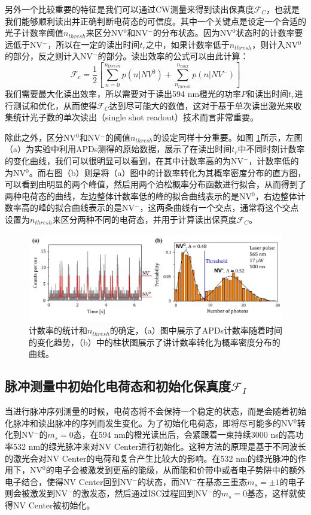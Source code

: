 \documentclass[type = bachelor]{whu-thesis}
\begin{document}
另外一个比较重要的特征是我们可以通过CW测量来得到读出保真度$\mathcal{F}_C$，也就是我们能够顺利读出并正确判断电荷态的可信度。其中一个关键点是设定一个合适的光子计数率阈值$n_{thresh}$来区分NV$^0$和NV$^-$的分布状态。因为NV$^0$状态时的计数率要远低于NV$^-$，所以在一定的读出时间$t_r$之中，如果计数率低于$n_{thresh}$，则计入NV$^0$的部分，反之则计入NV$^-$的部分。读出效率的公式可以由此计算：
\begin{equation}
  \mathcal{F}_c = \frac{1}{2}[\sum_{n=0}^{n_{thresh}}p(n|NV^0)+\sum_{n_{thresh}}^{n_{max}}p(n|NV^-)]
\end{equation}
我们需要最大化读出效率，所以需要对于读出594 nm橙光的功率$P$和读出时间$t_r$进行测试和优化，从而使得$\mathcal{F}_C$达到尽可能大的数值，这对于基于单次读出激光来收集统计光子数的单次读出（single shot readout）技术而言非常重要。

除此之外，区分NV$^0$和NV$^-$的阈值$n_{thresh}$的设定同样十分重要。如图 \ref{fig: n_thresh}所示，左图（a）为实验中利用APDs测得的原始数据，展示了在读出时间$t_r$中不同时刻计数率的变化曲线，我们可以很明显可以看到，在其中计数率高的为NV$^-$，计数率低的为NV$^0$。而右图（b）则是将（a）图中的计数率转化为其概率密度分布的直方图，可以看到由明显的两个峰值，然后用两个泊松概率分布函数进行拟合，从而得到了两种电荷态的曲线，左边整体计数率低的峰的拟合曲线表示的是NV$^0$，右边整体计数率高的峰的拟合曲线表示的是NV$^-$，这两条曲线有一个交点，通常将这个交点设置为$n_{thresh}$来区分两种不同的电荷态，并用于计算读出保真度$\mathcal{F}_C$。

\begin{figure}
  \centering
  \includegraphics[width=1.0\textwidth]{figures/Chapter 3/n_thresh.png}
  \caption[计数率的统计和$n_{thresh}$的确定]{计数率的统计和$n_{thresh}$的确定，（a）图中展示了APDs计数率随着时间的变化趋势，（b）中的柱状图展示了讲计数率转化为概率密度分布的曲线\cite{Aslam2013}。}
  \label{fig: n_thresh}
\end{figure}

\subsection{脉冲测量中初始化电荷态和初始化保真度$\mathcal{F}_I$}
当进行脉冲序列测量的时候，电荷态将不会保持一个稳定的状态，而是会随着初始化脉冲和读出脉冲的序列而发生变化。为了初始化电荷态，即将尽可能多的NV$^0$转化到NV$^-$的$m_s=0$态，在594 nm的橙光读出后，会紧跟着一束持续3000 ns的高功率532 nm的绿光脉冲来对NV Center进行初始化。这种方法的原理是基于不同波长的激光会对NV Center的电荷和复合产生比较大的影响。在532 nm的绿光脉冲的作用下，NV$^0$的电子会被激发到更高的能级，从而能和价带中或者电子势阱中的额外电子结合，使得NV Center回到NV$^-$的状态，而NV$^-$在基态三重态$m_s=±1$的电子则会被激发到NV$^-$的激发态，然后通过ISC过程回到NV$^-$的$m_s=0$基态，这样就使得NV Center被初始化。
\end{document}
